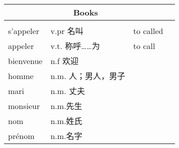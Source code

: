 \begingroup
\setlength{\tabcolsep}{6pt} %
\renewcommand{\arraystretch}{1.5}
\normalsize
\begin{tabular}{|p{4.0cm}|p{7.0cm}|p{6.5cm}|>{\huge}c}
    
    \hline
     \multicolumn{3}{|c|}{\cellcolor{gray!40} \textbf{\Large Books}}\\[0.5cm]
     \hline
    {\cellcolor{orange!15}{\textcolor{black}{Words}}} & {\cellcolor{orange!15}{\textcolor{black}{Explication}}}&{\cellcolor{orange!15}{\textcolor{black}{L'anglais}}}\\
    \hline
    
    s'appeler& v.pr 名叫& to called\\
    \hline
    appeler&v.t. 称呼……为& to call \\
    \hline
    bienvenue&n.f 欢迎& \\
    \hline
    homme&n.m. 人；男人，男子&\\ 
    \hline
    mari&n.m. 丈夫&\\
    \hline
    monsieur&n.m.先生 & \\
    \hline
    nom&n.m.姓氏 & \\ 
     \hline 
     prénom&n.m.名字 & \\ 
     \hline
\end{tabular}

\endgroup

